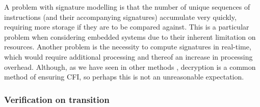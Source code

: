 A problem with signature modelling is that the number of unique sequences of instructions (and their accompanying signatures) accumulate very quickly, requiring more storage if they are to be compared against. This is a particular problem when considering embedded systems due to their inherent limitation on resources. Another problem is the necessity to compute signatures in real-time, which would require additional processing and thereof an increase in processing overhead. Although, as we have seen in other methods \cite{Davi2015} \cite{Lee2019}, decryption is a common method of ensuring CFI, so perhaps this is not an unreasonable expectation.

\subsubsection{Verification on transition}


